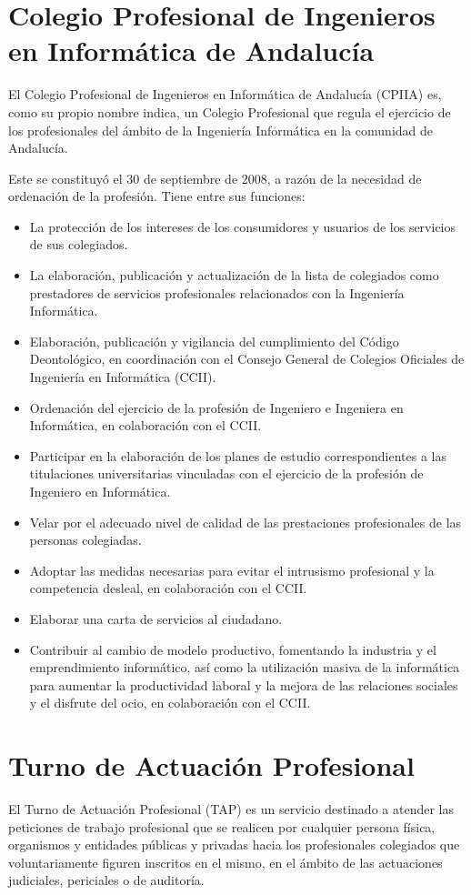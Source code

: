 \section{Colegio Profesional de Ingenieros en Informática de Andalucía}
El Colegio Profesional de Ingenieros en Informática de Andalucía (CPIIA) es, como su propio nombre indica, un Colegio Profesional que regula el ejercicio de los profesionales del ámbito de la Ingeniería Informática en la comunidad de Andalucía.

Este se constituyó el 30 de septiembre de 2008, a razón de la necesidad de ordenación de la profesión\cite{cpiia}. Tiene entre sus funciones:
\begin{itemize}
\item La protección de los intereses de los consumidores y usuarios de los servicios de sus colegiados.
\item La elaboración, publicación y actualización de la lista de colegiados como prestadores de servicios profesionales relacionados con la Ingeniería Informática.
\item Elaboración, publicación y vigilancia del cumplimiento del Código Deontológico, en coordinación con el Consejo General de Colegios Oficiales de Ingeniería en Informática (CCII).
\item Ordenación del ejercicio de la profesión de Ingeniero e Ingeniera en Informática, en colaboración con el CCII.
\item Participar en la elaboración de los planes de estudio correspondientes a las titulaciones universitarias vinculadas con el ejercicio de la profesión de Ingeniero en Informática.
\item Velar por el adecuado nivel de calidad de las prestaciones profesionales de las personas colegiadas.
\item Adoptar las medidas necesarias para evitar el intrusismo profesional y la competencia desleal, en colaboración con el CCII.
\item Elaborar una carta de servicios al ciudadano.
\item Contribuir al cambio de modelo productivo, fomentando la industria y el emprendimiento informático, así como la utilización masiva de la informática para aumentar la productividad laboral y la mejora de las relaciones sociales y el disfrute del ocio, en colaboración con el CCII.
\end{itemize}


\section{Turno de Actuación Profesional}
El Turno de Actuación Profesional (TAP) es un servicio destinado a atender las peticiones de trabajo profesional que se realicen por cualquier persona física, organismos y entidades públicas y privadas hacia los profesionales colegiados que voluntariamente figuren inscritos en el mismo, en el ámbito de las actuaciones judiciales, periciales o de auditoría\cite{tapecoourense}.

